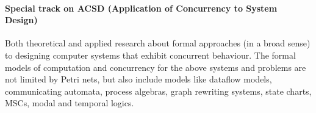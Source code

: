 \documentclass[10pt]{article}
\begin{document}
%
\newpage

\vspace*{-0.5cm}
\paragraph*{Special track on ACSD (Application of Concurrency to System Design)}
Both theoretical and applied research about formal approaches (in a broad sense) to designing computer systems that exhibit concurrent behaviour.
The formal models of computation and concurrency for the above systems and problems are not limited by Petri nets, but also include models like dataflow models, communicating automata, process algebras, graph rewriting systems, state charts, MSCs, modal and temporal logics.
\end{document}
